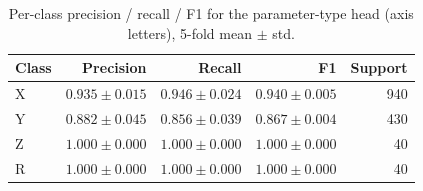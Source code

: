 \begin{table}[h]
\centering
\caption{Per-class precision / recall / F1 for the parameter-type head (axis letters), 5-fold mean $\pm$ std.}
\label{tab:per_class_param_type}
\begin{tabular}{l r r r r}
\toprule
Class & Precision & Recall & F1 & Support \\
\midrule
X & $0.935 \pm 0.015$ & $0.946 \pm 0.024$ & $0.940 \pm 0.005$ & 940 \\
Y & $0.882 \pm 0.045$ & $0.856 \pm 0.039$ & $0.867 \pm 0.004$ & 430 \\
Z & $1.000 \pm 0.000$ & $1.000 \pm 0.000$ & $1.000 \pm 0.000$ & 40 \\
R & $1.000 \pm 0.000$ & $1.000 \pm 0.000$ & $1.000 \pm 0.000$ & 40 \\
\bottomrule
\end{tabular}
\end{table}
